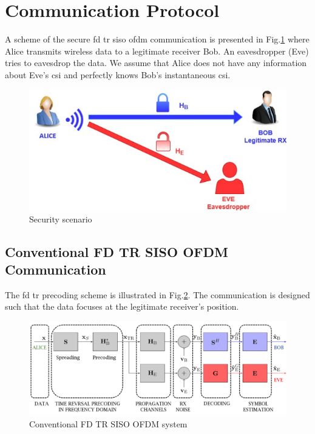 \section{Communication Protocol}
\label{sec:communication-protocol}

A scheme of the secure \gls{fd} \gls{tr} \gls{siso} \gls{ofdm} communication is presented in Fig.\ref{fig:A_B_E_scheme} where Alice transmits wireless data to a legitimate receiver Bob. An eavesdropper (Eve) tries to eavesdrop the data. We assume that Alice does not have any information about Eve's \gls{csi} and perfectly knows Bob's instantaneous \gls{csi}. 
\begin{figure}[h!]
    \centering
    \includegraphics[width=.5\linewidth]{img/a_b_e_scheme.jpg}
    \caption{Security scenario}
    \label{fig:A_B_E_scheme}
\end{figure} 




\subsection{Conventional FD TR SISO OFDM Communication}
The \gls{fd} \gls{tr} precoding scheme is illustrated in Fig.\ref{fig:TR_FD_classical}.  The communication is designed such that the data focuses at the legitimate receiver's position. 
\begin{figure}[h!]
    \centering
    \includegraphics[width=1\linewidth]{img/Capture.PNG}
    \caption{Conventional FD TR SISO OFDM system}
    \label{fig:TR_FD_classical}
\end{figure} 


